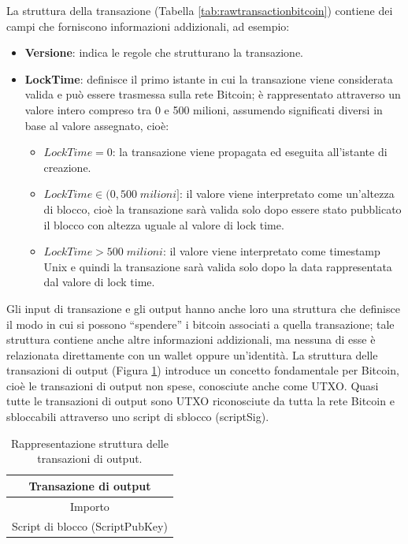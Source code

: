 La struttura della transazione (Tabella \ref{tab:rawtransactionbitcoin}) contiene dei campi che forniscono informazioni addizionali, ad esempio:
\begin{itemize}
  \item {\bf Versione\/}: indica le regole che strutturano la transazione.
  \item {\bf LockTime\/}: definisce il primo istante in cui la transazione viene considerata valida e può essere trasmessa sulla rete Bitcoin; è rappresentato attraverso un valore intero compreso tra 0 e 500 milioni, assumendo  significati diversi in base al valore assegnato, cioè:
  \begin{itemize}
    \item \(LockTime = 0 \): la transazione viene propagata ed eseguita all’istante di creazione.
    \item \( LockTime \in (0, 500\; milioni]\): il valore viene interpretato come un’altezza di blocco, cioè la transazione sarà valida solo dopo essere stato pubblicato il blocco con altezza uguale al valore di lock time.
    \item \(LockTime > 500\; milioni\): il valore viene interpretato come timestamp Unix e quindi la transazione sarà valida solo dopo la data rappresentata dal valore di lock time.
  \end{itemize}
\end{itemize}

Gli input di transazione e gli output hanno anche loro una struttura che definisce il  modo in cui si possono “spendere” i bitcoin associati a quella transazione; tale struttura contiene anche  altre informazioni addizionali, ma nessuna di esse è relazionata direttamente con un wallet oppure un’identità. \newline
La struttura delle transazioni di output (Figura \ref{tab:outputtransaztionbitcoin}) introduce un concetto fondamentale per Bitcoin, cioè le transazioni di output non spese, conosciute anche come UTXO.
Quasi tutte le transazioni di output sono UTXO riconosciute da tutta la rete Bitcoin e sbloccabili attraverso uno script di sblocco (scriptSig).

\begin{table}[H]
       \centering\small
           \begin{tabular}{|c|}
               \hline
               \textbf{Transazione di output}\\
               \hline \hline
               Importo   \\
               \hline
               Script di blocco (ScriptPubKey) \\
               \hline
       \end{tabular}
       \caption{Rappresentazione struttura delle transazioni di output.\label{tab:outputtransaztionbitcoin}}
   \end{table}

